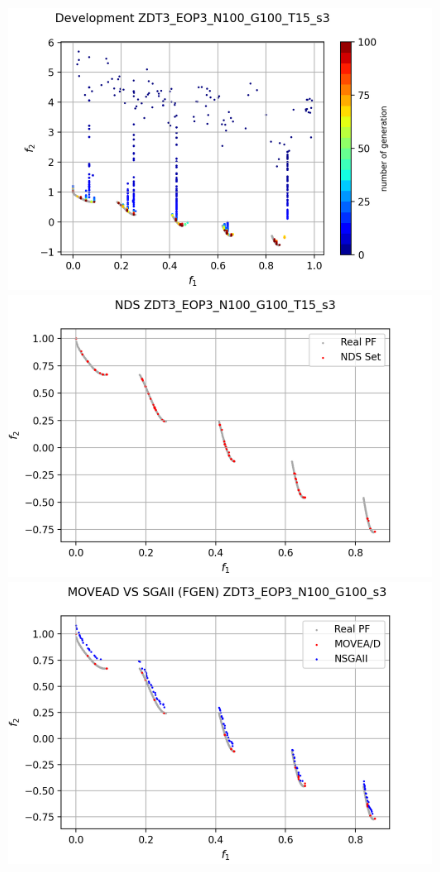 \begin{minipage}[H]{\linewidth}
\begin{minipage}[b]{0.3\linewidth}

\begin{figure}[H]
        \centering
        \includegraphics[scale=0.4]{figures/ZDT3_EOP3_N100_G100_T15/s3_dev.png}\\
        \includegraphics[scale=0.36]{figures/ZDT3_EOP3_N100_G100_T15/s3_nds.png}\\
        \includegraphics[scale=0.36]{figures/ZDT3_EOP3_N100_G100_T15/s3_comp.png}\\

\end{figure}
\end{minipage}
\end{minipage}
